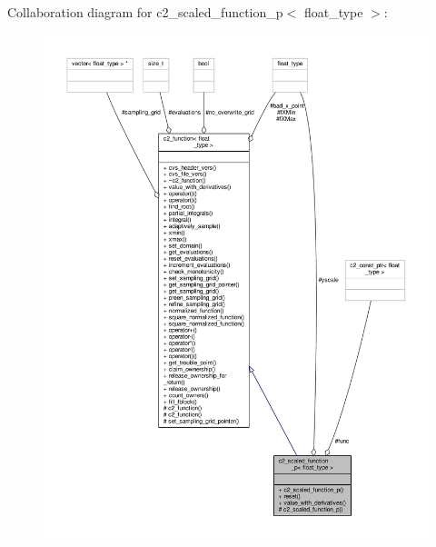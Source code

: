 Collaboration diagram for c2\+\_\+scaled\+\_\+function\+\_\+p$<$ float\+\_\+type $>$\+:
\nopagebreak
\begin{figure}[H]
\begin{center}
\leavevmode
\includegraphics[width=350pt]{classc2__scaled__function__p__coll__graph}
\end{center}
\end{figure}
